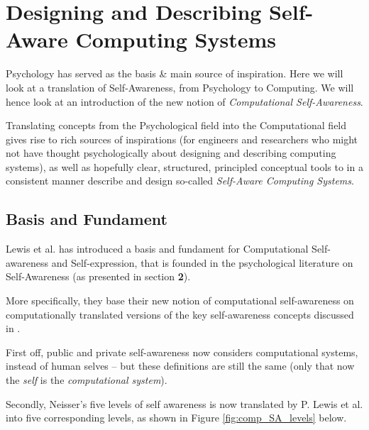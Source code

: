 \section{Designing and Describing Self-Aware Computing Systems}

Psychology has served as the basis \& main source of inspiration. Here we will look at a translation of Self-Awareness, from Psychology to Computing. We will hence look at an introduction of the new notion of \textit{Computational Self-Awareness}.

Translating concepts from the Psychological field into the Computational field gives rise to rich sources of inspirations (for engineers and researchers who might not have thought psychologically about designing and describing computing systems), as well as hopefully clear, structured, principled conceptual tools to in a consistent manner describe and design so-called \textit{Self-Aware Computing Systems}.

	\subsection{Basis and Fundament}

	Lewis et al. \cite{sacs16_ch2} has introduced a basis and fundament for Computational Self-awareness and Self-expression, that is founded in the psychological literature on Self-Awareness (as presented in section \textbf{2}).

	More specifically, they base their new notion of computational self-awareness on computationally translated versions of the key self-awareness concepts discussed in .

	First off, public and private self-awareness now considers computational systems, instead of human selves -- but these definitions are still the same (only that now the \textit{self} is the \textit{computational system}).

	Secondly, Neisser's five levels of self awareness is now translated by P. Lewis et al. \cite{sacs16_ch2} into five corresponding levels, as shown in Figure \ref{fig:comp_SA_levels} below.

